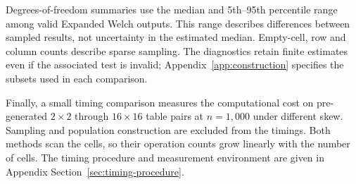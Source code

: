 Degrees-of-freedom summaries use the median and 5th--95th percentile range
among valid Expanded Welch outputs. This range describes differences
between sampled results, not uncertainty in the estimated median.
Empty-cell, row and column counts describe sparse sampling.
The diagnostics retain finite estimates even if the associated test is
invalid; Appendix~\ref{app:construction} specifies the subsets used in
each comparison.

Finally, a small timing comparison measures the computational cost on
pre-generated \(2\times2\) through \(16\times16\) table pairs at
\(n=1{,}000\) under different skew. Sampling and population construction
are excluded from the timings. Both methods scan the cells, so their
operation counts grow linearly with the number of cells. The timing
procedure and measurement environment are given in Appendix
Section~\ref{sec:timing-procedure}.
